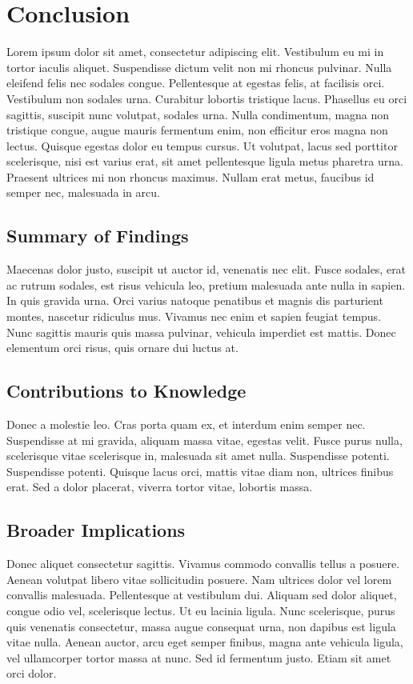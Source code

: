 \chapter{Conclusion}
\label{chap:Conclusion}
Lorem ipsum dolor sit amet, consectetur adipiscing elit. Vestibulum eu mi in tortor iaculis aliquet. Suspendisse dictum velit non mi rhoncus pulvinar. Nulla eleifend felis nec sodales congue. Pellentesque at egestas felis, at facilisis orci. Vestibulum non sodales urna. Curabitur lobortis tristique lacus. Phasellus eu orci sagittis, suscipit nunc volutpat, sodales urna. Nulla condimentum, magna non tristique congue, augue mauris fermentum enim, non efficitur eros magna non lectus. Quisque egestas dolor eu tempus cursus. Ut volutpat, lacus sed porttitor scelerisque, nisi est varius erat, sit amet pellentesque ligula metus pharetra urna. Praesent ultrices mi non rhoncus maximus. Nullam erat metus, faucibus id semper nec, malesuada in arcu.



\section{Summary of Findings}
\label{sec:summary_findings}
Maecenas dolor justo, suscipit ut auctor id, venenatis nec elit. Fusce sodales, erat ac rutrum sodales, est risus vehicula leo, pretium malesuada ante nulla in sapien. In quis gravida urna. Orci varius natoque penatibus et magnis dis parturient montes, nascetur ridiculus mus. Vivamus nec enim et sapien feugiat tempus. Nunc sagittis mauris quis massa pulvinar, vehicula imperdiet est mattis. Donec elementum orci risus, quis ornare dui luctus at.

\section{Contributions to Knowledge}
\label{sec:contributions_conclusion}

Donec a molestie leo. Cras porta quam ex, et interdum enim semper nec. Suspendisse at mi gravida, aliquam massa vitae, egestas velit. Fusce purus nulla, scelerisque vitae scelerisque in, malesuada sit amet nulla. Suspendisse potenti. Suspendisse potenti. Quisque lacus orci, mattis vitae diam non, ultrices finibus erat. Sed a dolor placerat, viverra tortor vitae, lobortis massa.


\section{Broader Implications}
\label{sec:implications}
Donec aliquet consectetur sagittis. Vivamus commodo convallis tellus a posuere. Aenean volutpat libero vitae sollicitudin posuere. Nam ultrices dolor vel lorem convallis malesuada. Pellentesque at vestibulum dui. Aliquam sed dolor aliquet, congue odio vel, scelerisque lectus. Ut eu lacinia ligula. Nunc scelerisque, purus quis venenatis consectetur, massa augue consequat urna, non dapibus est ligula vitae nulla. Aenean auctor, arcu eget semper finibus, magna ante vehicula ligula, vel ullamcorper tortor massa at nunc. Sed id fermentum justo. Etiam sit amet orci dolor.



